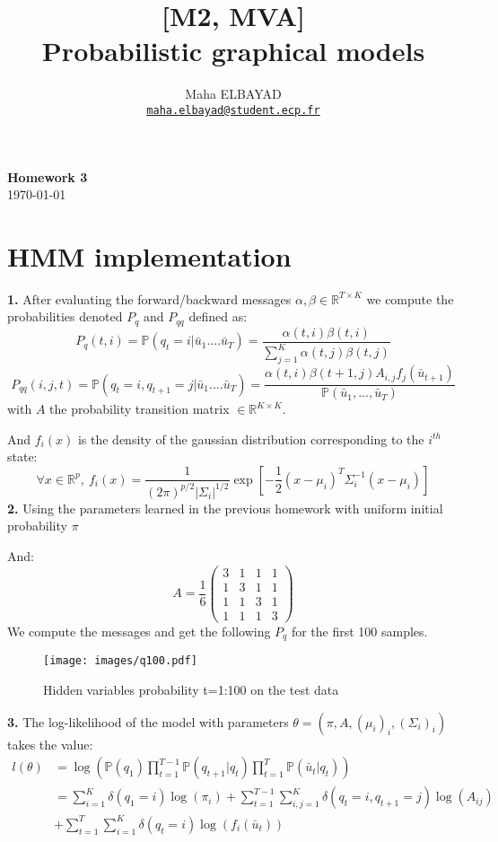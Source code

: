 \documentclass[11pt]{article}
\title{[M2, MVA]\\ Probabilistic graphical models}
\author{Maha ELBAYAD\\ \href{mailto:maha.elbayad@student.ecp.fr}{\tt maha.elbayad@student.ecp.fr}}
\date{}
\newcommand{\R}{\mathbb{R}}
\newcommand{\1}{\mathbbm{1}}
\newcommand{\0}{\mathbf{0}}
\newcommand{\p}{\mathbb{P}}
\begin{document}
\maketitle
\vspace{-10pt}
\begin{center}
{\huge \bf Homework 3}\\
\today
\vspace{10pt}
\end{center}

\vspace{7pt}

\section*{HMM implementation}
\textbf{1.} After evaluating the forward/backward messages $\alpha,\beta\in \R^{T\times K}$ we compute the probabilities denoted $P_q$ and $P_{qq}$ defined as:
\[P_q(t,i)=\p(q_t=i|\bar u_1....\bar u_T)=\frac{\alpha(t,i)\beta(t,i)}{\sum_{j=1}^K\alpha(t,j)\beta(t,j)}\]
\[P_{qq}(i,j,t)=\p(q_t=i,q_{t+1}=j|\bar u_1....\bar u_T)=\frac{\alpha(t,i)\beta(t+1,j)A_{i,j}f_j(\bar u_{t+1})}{\p(\bar u_1,...,\bar u_T)}\]
with $A$ the probability transition matrix $\in \R^{K\times K}$.

And $f_i(x)$ is the density of the gaussian distribution corresponding to the $i^{th}$ state:
\[\forall x\in\R^p,\:f_i(x)=\frac{1}{(2\pi)^{p/2}|\Sigma_i|^{1/2}}\exp\left[-\frac{1}{2}(x-\mu_i)^T\Sigma_i^{-1}(x-\mu_i)\right]\]
\textbf{2.} Using the parameters learned in the previous homework with uniform initial probability $\pi$

And: \[A=\frac{1}{6}\begin{pmatrix}3 &1 &1& 1\\1& 3& 1& 1\\1& 1& 3& 1\\1 &1 &1 &3\end{pmatrix}\]
We compute the messages and get the following $P_q$ for the first 100 samples.
\begin{figure}[H]
    \centering
    \texttt{[image: images/q100.pdf]}
    \caption{Hidden variables probability t=1:100 on the test data}
\end{figure}

\textbf{3.} The log-likelihood of the model with parameters $\theta=(\pi,A,(\mu_i)_i,(\Sigma_i)_i)$ takes the value:
\[\begin{split}
l(\theta)&=\log\left(\p(q_1)\prod_{t=1}^{T-1}\p(q_{t+1}|q_t)\prod_{t=1}^T\p(\bar u_t|q_t)\right)\\
&=\sum_{i=1}^K\delta(q_1=i)\log(\pi_i)+\sum_{t=1}^{T-1}\sum_{i,j=1}^K\delta(q_t=i,q_{t+1}=j)\log(A_{ij})\\
&+\sum_{t=1}^T\sum_{i=1}^K\delta(q_t=i)\log(f_i(\bar u_t))\\
\end{split}\]
\end{document}
